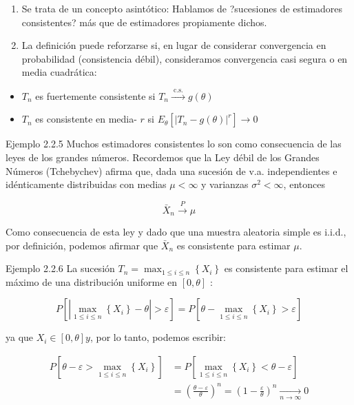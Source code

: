 \documentclass[
]{article}
\providecommand{\tightlist}{%
  \setlength{\itemsep}{0pt}\setlength{\parskip}{0pt}}
\begin{document}
\begin{enumerate}
\def\labelenumi{\arabic{enumi}.}
\tightlist
\item
  Se trata de un concepto asintótico: Hablamos de ?sucesiones de estimadores consistentes? más que de estimadores propiamente dichos.
\item
  La definición puede reforzarse si, en lugar de considerar convergencia en probabilidad (consistencia débil), consideramos convergencia casi segura o en media cuadrática:
\end{enumerate}

\begin{itemize}
\tightlist
\item
  \(T_{n}\) es fuertemente consistente si \(T_{n} \xrightarrow{\text { c.s. }} g(\theta)\)
\item
  \(T_{n}\) es consistente en media- \(r\) si \(E_{\theta}\left[\left|T_{n}-g(\theta)\right|^{r}\right] \longrightarrow 0\)
\end{itemize}

Ejemplo 2.2.5 Muchos estimadores consistentes lo son como consecuencia de las leyes de los grandes números. Recordemos que la Ley débil de los Grandes Números (Tchebychev) afirma que, dada una sucesión de v.a. independientes e idénticamente distribuidas con medias \(\mu<\infty\) y varianzas \(\sigma^{2}<\infty\), entonces

\[
\bar{X}_{n} \xrightarrow{P} \mu
\]

Como consecuencia de esta ley y dado que una muestra aleatoria simple es i.i.d., por definición, podemos afirmar que \(\bar{X}_{n}\) es consistente para estimar \(\mu\).

Ejemplo 2.2.6 La sucesión \(T_{n}=\max _{1 \leq i \leq n}\left\{X_{i}\right\}\) es consistente para estimar el máximo de una distribución uniforme en \([0, \theta]\) :

\[
P\left[\left|\max _{1 \leq i \leq n}\left\{X_{i}\right\}-\theta\right|>\varepsilon\right]=P\left[\theta-\max _{1 \leq i \leq n}\left\{X_{i}\right\}>\varepsilon\right]
\]

ya que \(X_{i} \in[0, \theta] y\), por lo tanto, podemos escribir:

\[
\begin{aligned}
P\left[\theta-\varepsilon>\max _{1 \leq i \leq n}\left\{X_{i}\right\}\right] & =P\left[\max _{1 \leq i \leq n}\left\{X_{i}\right\}<\theta-\varepsilon\right] \\
& =\left(\frac{\theta-\varepsilon}{\theta}\right)^{n}=\left(1-\frac{\varepsilon}{\theta}\right)^{n} \underset{n \rightarrow \infty}{\longrightarrow} 0
\end{aligned}
\]
\end{document}
